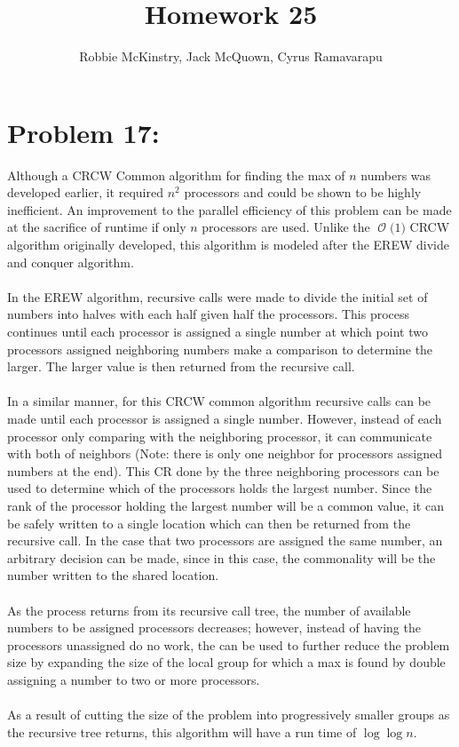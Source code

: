 \documentclass[12pt]{article}
\newcommand{\BigO}[1]{\ensuremath{\operatorname{\mathcal{O}}\bigl(#1\bigr)}}
\begin{document}
\title{Homework 25}
\author{Robbie McKinstry, Jack McQuown, Cyrus Ramavarapu}
\renewcommand{\today}{31 October 2016}
\renewcommand{\baselinestretch}{1.5}
\maketitle

\section*{Problem 17: }
Although a CRCW Common algorithm for finding the max of $n$ numbers
was developed earlier, it required $n^2$ processors and could be shown
to be highly inefficient.  An improvement to the parallel efficiency of
this problem can be made at the sacrifice of runtime if only $n$ 
processors are used.  Unlike the \BigO{1} CRCW algorithm originally
developed, this algorithm is modeled after the EREW divide and
conquer algorithm.\\\\
In the EREW algorithm, recursive calls were made to divide the 
initial set of numbers into halves with each half given half
the processors.  This process continues until each processor
is assigned a single number at which point two processors
assigned neighboring numbers make a comparison to determine the
larger.  The larger value is then returned from the recursive
call.\\\\
In a similar manner, for this CRCW common algorithm recursive
calls can be made until each processor is assigned a single 
number.  However, instead of each processor only comparing
with the neighboring processor, it can communicate with both
of neighbors (Note: there is only one neighbor for processors
assigned numbers at the end).  This CR done by the three 
neighboring processors can be used to determine which of 
the processors holds the largest number.  Since the rank
of the processor holding the largest number will be
a common value, it can be safely written to a single location
which can then be returned from the recursive call.  In the
case that two processors are assigned the same number,
an arbitrary decision can be made, since in this case,
the commonality will be the number written to the shared
location.\\\\
As the process returns from its recursive call tree, the number of
available numbers to be assigned processors decreases; however,
instead of having the processors unassigned do no work, the can be
used to further reduce the problem size by expanding the size
of the local group for which a max is found by double assigning
a number to two or more processors.\\\\ 
As a result of cutting the size of the problem into progressively
smaller groups as the recursive tree returns, this algorithm
will have a run time of $\log \log n$.
\end{document}

